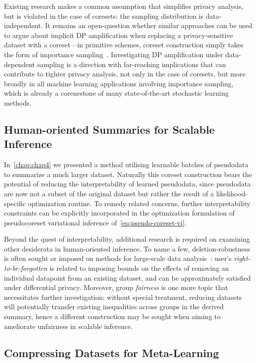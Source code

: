 Existing research makes a common assumption that simplifies privacy analysis, but is violated in the case of coresets: the sampling distribution is data-independent. It remains an open-question whether similar approaches can be used to argue about implicit DP amplification when replacing a privacy-sensitive dataset with a coreset---in primitive schemes, coreset construction simply takes the form of importance sampling~\citep{bachem17}. Investigating DP amplification under data-dependent sampling is a direction with far-reaching implications that can contribute to tighter privacy analysis, not only in the case of coresets, but more broadly in all machine learning applications involving importance sampling, which is already a corenestone of many state-of-the-art stochastic learning methods. 


\subsection{Human-oriented Summaries for Scalable Inference}
\label{subsec:human-oriented-pseudodata}

In~\cref{chap:chap4} we presented a method utilising learnable batches of pseudodata to summarize a much larger dataset. Naturally this coreset construction bears the potential of reducing the interpretability of learned pseudodata, since pseudodata are now not a subset of the original dataset but rather the result of a likelihood-specific optimization routine. To remedy related concerns, further interpretability constraints can be explicitly incorporated in the optimization formulation of pseudocoreset variational inference of~\cref{eq:pseudo-coreset-vi}.

Beyond the quest of interpretability, additional research is required on examining other desiderata in human-oriented inference. To name a few, deletion-robustness is often sought or imposed on methods for large-scale data analysis~\citep{mirzasoleiman17, ginart19}: user's \emph{right-to-be-forgotten} is related to imposing bounds on the effects of removing an individual datapoint from an existing dataset, and can be approximately satisfied under differential privacy. Moreover, group \emph{fairness} is one more topic that necessitates further investigation: without special treatment, reducing datasets will potentially transfer existing inequalities across groups in the derived summary, hence a different construction may be sought when aiming to ameliorate unfairness in scalable inference.  

\subsection{Compressing Datasets for Meta-Learning}
\label{subsec:metacoresets}

